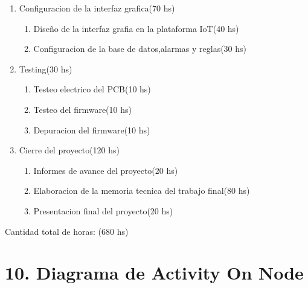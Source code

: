 \documentclass[
11pt, %
codirector, %
]{charter}
\begin{document}
\begin{enumerate}
\begin{enumerate}
	\end{enumerate}
\item Configuracion de la interfaz grafica(70 hs)	
    \begin{enumerate}
		\item Diseño de la interfaz grafia en la plataforma IoT(40 hs)
		\item Configuracion de la base de datos,alarmas y reglas(30 hs)
	\end{enumerate}
\item Testing(30 hs)	
    \begin{enumerate}
		\item Testeo electrico del PCB(10 hs)
		\item Testeo del firmware(10 hs)
		\item Depuracion del firmware(10 hs)
	\end{enumerate}
\item Cierre del proyecto(120 hs)	
    \begin{enumerate}
		\item Informes de avance del proyecto(20 hs)
		\item Elaboracion de la memoria tecnica del trabajo final(80 hs)
		\item Presentacion final del proyecto(20 hs)
	\end{enumerate}


\end{enumerate}

Cantidad total de horas: (680 hs)

\section{10. Diagrama de Activity On Node}
\label{sec:AoN}
\end{document}
